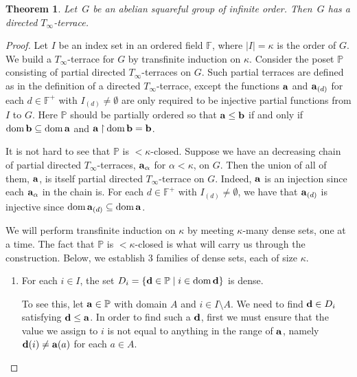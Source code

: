 \documentclass[12pt,a4paper]{article}
\newtheorem{thm}{Theorem}[section]
\newcommand{\F}{\mathbb{F}}
\DeclareMathOperator{\dom}{dom}
\newcommand{\rest}{\mathbin{\upharpoonright}}
\newcommand{\st}{\; | \;}
\newcommand{\set}[2]{\left\{#1\st #2 \right\}}
\renewcommand{\P}{\mathbb{P}}
\renewcommand{\a}{\textup{\textbf{a}}}
\renewcommand{\b}{\textup{\textbf{b}}}
\renewcommand{\d}{\textup{\textbf{d}}}
\begin{document}
\begin{thm}\label{th:T_infty}
Let~$G$ be an abelian squareful group of infinite order.   Then~$G$ has a directed $T_{\infty}$-terrace.
\end{thm}

\begin{proof}
Let $I$ be an index set in an ordered field $\F$, where $|I|=\kappa$ is the order of $G$. We build a $T_\infty$-terrace for $G$ by transfinite induction on $\kappa$. Consider the poset $\P$ consisting of partial directed $T_\infty$-terraces on $G$. Such partial terraces are defined as in the definition of a directed $T_\infty$-terrace, except the functions $\a$ and $\a_{(d)}$ for each $d \in \F^+$ with $I_{(d)} \neq \emptyset$ are only required to be injective partial functions from $I$ to $G$. Here $\P$ should be partially ordered so that $\a \leq \b$ if and only if $\dom \b \subseteq \dom \a$ and $\a \rest \dom \b = \b$.

It is not hard to see that $\P$ is $<\kappa$-closed. Suppose we have an decreasing chain of partial directed $T_\infty$-terraces, $\a_{\alpha}$ for $\alpha < \kappa$, on $G$. Then the union of all of them, $\a$, is itself partial directed $T_\infty$-terrace on $G$. Indeed, $\a$ is an injection since each $\a_\alpha$ in the chain is. For each $d \in \F^+$ with $I_{(d)} \neq \emptyset$, we have that $\a_{(d)}$ is injective since $\dom\a_{(d)} \subseteq \dom\a$. 

We will perform transfinite induction on $\kappa$ by meeting $\kappa$-many dense sets, one at a time. The fact that $\P$ is $<\kappa$-closed is what will carry us through the construction. Below, we establish 3 families of dense sets, each of size $\kappa$.

\begin{enumerate}
	\item \label{item:DomainDense} For each $i \in I$, the set $D_i=\set{\d \in \P}{i \in \dom \d }$ is dense. 
	
	To see this, let $\a \in \P$ with domain $A$ and $i \in I \setminus A$. We need to find $\d \in D_i$ satisfying $\d \leq \a$. In order to find such a $\d$, first we must ensure that the value we assign to $i$ is not equal to anything in the range of $\a$, namely $\d(i) \neq \a(a)$ for each $a \in A$. 
	

\end{enumerate}
\end{proof}
\end{document}
